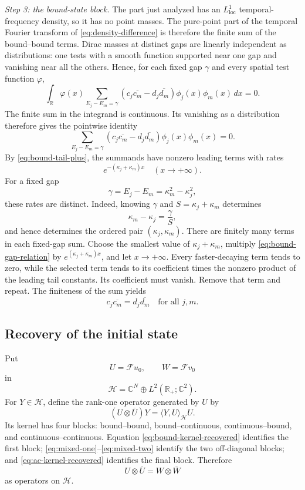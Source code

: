 \documentclass[11pt]{amsart}
\numberwithin{equation}{section}
\theoremstyle{remark}
\newcommand{\R}{\mathbb R}
\newcommand{\C}{\mathbb C}
\newcommand{\HH}{\mathcal H}
\begin{document}
\smallskip
\noindent
\emph{Step 3: the bound-state block.}
The part just analyzed has an $L^1_{\mathrm{loc}}$ temporal-frequency density,
so it has no
point masses.  The pure-point part of the temporal Fourier transform of
\eqref{eq:density-difference} is therefore the finite sum of the bound--bound
terms.  Dirac masses at distinct gaps are linearly independent as
distributions: one tests with a smooth function supported near one gap and
vanishing near all the others.  Hence, for each fixed gap $\gamma$ and every
spatial test function $\varphi$,
\[
 \int_\R\varphi(x)
 \sum_{E_j-E_m=\gamma}
 \left(c_j\overline{c_m}-d_j\overline{d_m}\right)
 \phi_j(x)\phi_m(x)\,dx=0.
\]
The finite sum in the integrand is continuous.  Its vanishing as a
distribution therefore gives the pointwise identity
\begin{equation}
 \sum_{E_j-E_m=\gamma}
 \left(c_j\overline{c_m}-d_j\overline{d_m}\right)
 \phi_j(x)\phi_m(x)=0.
 \label{eq:bound-gap-relation}
\end{equation}
By \eqref{eq:bound-tail-plus}, the summands have nonzero leading terms with
rates
\[
 e^{-(\kappa_j+\kappa_m)x}
 \quad (x\to+\infty).
\]
For a fixed gap
\[
 \gamma=E_j-E_m=\kappa_m^2-\kappa_j^2,
\]
these rates are distinct.  Indeed, knowing $\gamma$ and
$S=\kappa_j+\kappa_m$ determines
\[
 \kappa_m-\kappa_j=\frac{\gamma}{S},
\]
and hence determines the ordered pair $(\kappa_j,\kappa_m)$.  There are finitely many terms in each fixed-gap sum.  Choose the smallest
value of $\kappa_j+\kappa_m$, multiply
\eqref{eq:bound-gap-relation} by $e^{(\kappa_j+\kappa_m)x}$, and let
$x\to+\infty$.  Every faster-decaying term tends to zero, while the selected
term tends to its coefficient times the nonzero product of the leading tail
constants.  Its coefficient must vanish.  Remove that term and repeat.  The
finiteness of the sum yields
\begin{equation}
 c_j\overline{c_m}=d_j\overline{d_m}
 \quad\text{for all $j,m$}.
 \label{eq:bound-kernel-recovered}
\end{equation}

\subsection{Recovery of the initial state}

Put
\[
 U=\mathcal Fu_0,
 \qquad
 W=\mathcal Fv_0
\]
in
\[
 \HH=\C^N\oplus L^2(\R_+;\C^2).
\]
For $Y\in\HH$, define the rank-one operator generated by $U$ by
\[
 (U\otimes\overline U)Y=\langle Y,U\rangle_{\HH}U.
\]
Its kernel has four blocks: bound--bound, bound--continuous,
continuous--bound, and continuous--continuous.  Equation
\eqref{eq:bound-kernel-recovered} identifies the first block;
\eqref{eq:mixed-one}--\eqref{eq:mixed-two} identify the two off-diagonal
blocks; and \eqref{eq:ac-kernel-recovered} identifies the final block.
Therefore
\begin{equation}
 U\otimes\overline U=W\otimes\overline W
 \label{eq:rank-one-equality}
\end{equation}
as operators on $\HH$.
\end{document}

